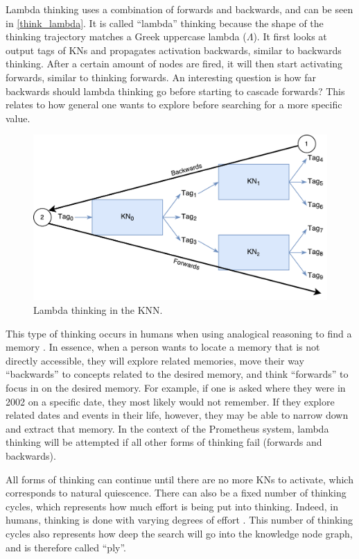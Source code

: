 \documentclass[titlepage,11pt]{article}
\begin{document}
Lambda thinking uses a combination of forwards and backwards, and can be seen in \autoref{think_lambda}. It is called ``lambda'' thinking because the shape of the thinking trajectory matches a Greek uppercase lambda ($\Lambda$). It first looks at output tags of KNs and propagates activation backwards, similar to backwards thinking. After a certain amount of nodes are fired, it will then start activating forwards, similar to thinking forwards. An interesting question is how far backwards should lambda thinking go before starting to cascade forwards? This relates to how general one wants to explore before searching for a more specific value.

\begin{figure}[!htb]
	\includegraphics[width=\columnwidth]{figures/lambda_thinking.pdf}
	\caption{Lambda thinking in the KNN.}
	\label{think_lambda}
\end{figure}

This type of thinking occurs in humans when using analogical reasoning to find a memory \cite{vybihal-lambda}. In essence, when a person wants to locate a memory that is not directly accessible, they will explore related memories, move their way ``backwards'' to concepts related to the desired memory, and think ``forwards'' to focus in on the desired memory. For example, if one is asked where they were in 2002 on a specific date, they most likely would not remember. If they explore related dates and events in their life, however, they may be able to narrow down and extract that memory. In the context of the Prometheus system, lambda thinking will be attempted if all other forms of thinking fail (forwards and backwards).

All forms of thinking can continue until there are no more KNs to activate, which corresponds to natural quiescence. There can also be a fixed number of thinking cycles, which represents how much effort is being put into thinking. Indeed, in humans, thinking is done with varying degrees of effort \cite{thinking}. This number of thinking cycles also represents how deep the search will go into the knowledge node graph, and is therefore called ``ply''.
\end{document}
